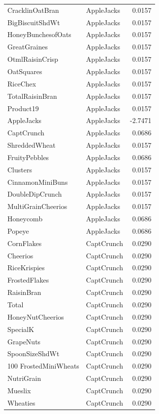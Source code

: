 \begin{longtable}{llr}
CracklinOatBran & AppleJacks & 0.0157 \\
BigBiscuitShdWt & AppleJacks & 0.0157 \\
HoneyBunchesofOats & AppleJacks & 0.0157 \\
GreatGraines & AppleJacks & 0.0157 \\
OtmlRaisinCrisp & AppleJacks & 0.0157 \\
OatSquares & AppleJacks & 0.0157 \\
RiceChex & AppleJacks & 0.0157 \\
TotalRaisinBran & AppleJacks & 0.0157 \\
Product19 & AppleJacks & 0.0157 \\
AppleJacks & AppleJacks & -2.7471 \\
CaptCrunch & AppleJacks & 0.0686 \\
ShreddedWheat & AppleJacks & 0.0157 \\
FruityPebbles & AppleJacks & 0.0686 \\
Clusters & AppleJacks & 0.0157 \\
CinnamonMiniBuns & AppleJacks & 0.0157 \\
DoubleDipCrunch & AppleJacks & 0.0157 \\
MultiGrainCheerios & AppleJacks & 0.0157 \\
Honeycomb & AppleJacks & 0.0686 \\
Popeye & AppleJacks & 0.0686 \\
CornFlakes & CaptCrunch & 0.0290 \\
Cheerios & CaptCrunch & 0.0290 \\
RiceKrispies & CaptCrunch & 0.0290 \\
FrostedFlakes & CaptCrunch & 0.0290 \\
RaisinBran & CaptCrunch & 0.0290 \\
Total & CaptCrunch & 0.0290 \\
HoneyNutCheerios & CaptCrunch & 0.0290 \\
SpecialK & CaptCrunch & 0.0290 \\
GrapeNuts & CaptCrunch & 0.0290 \\
SpoonSizeShdWt & CaptCrunch & 0.0290 \\
100%
FrostedMiniWheats & CaptCrunch & 0.0290 \\
NutriGrain & CaptCrunch & 0.0290 \\
Mueslix & CaptCrunch & 0.0290 \\
Wheaties & CaptCrunch & 0.0290 \\

\end{longtable}

